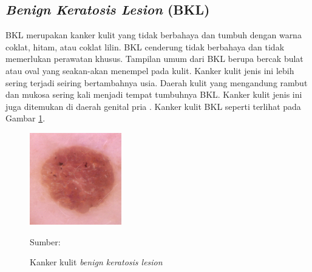     \subsection{\textit{Benign Keratosis Lesion} (BKL)}
    BKL merupakan kanker kulit yang tidak berbahaya dan tumbuh dengan warna coklat, hitam, atau coklat lilin. BKL cenderung tidak berbahaya dan tidak memerlukan perawatan khusus. Tampilan umum dari BKL berupa bercak bulat atau oval yang seakan-akan menempel pada kulit. Kanker kulit jenis ini lebih sering terjadi seiring bertambahnya usia. Daerah kulit yang mengandung rambut dan mukosa sering kali menjadi tempat tumbuhnya BKL. Kanker kulit jenis ini juga ditemukan di daerah genital pria \citep{Hall2019}. Kanker kulit BKL seperti terlihat pada Gambar \ref{fig:bkl}.
    \begin{figure}[H] 
        \begin{center} 
            \includegraphics[width=4cm]{../img/Skin Cancer BKL - Latex.jpg}
            \caption{Kanker kulit \textit{benign keratosis lesion}} 
            \label{fig:bkl}
            Sumber: \citep{Codella2018,Combalia2019,Tschandl2018}
        \end{center} 
    \end{figure}

